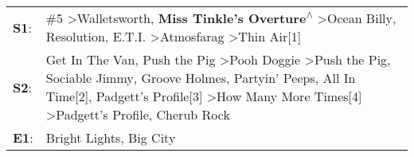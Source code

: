 \begin{supertabular}{p{0.03\textwidth}p{0.92\textwidth}}
 \textbf{S1}:  &                                                                                                                                                                                              \#5\textsuperscript{} \textgreater \enspace Walletsworth\textsuperscript{}, \enspace \textbf{Miss Tinkle's Overture\textsuperscript{$\wedge$}} \textgreater \enspace Ocean Billy\textsuperscript{}, \enspace Resolution\textsuperscript{}, \enspace E.T.I.\textsuperscript{} \textgreater \enspace Atmosfarag\textsuperscript{} \textgreater \enspace Thin Air[1]\textsuperscript{}  \enspace  \\
 \textbf{S2}:  &  Get In The Van\textsuperscript{}, \enspace Push the Pig\textsuperscript{} \textgreater \enspace Pooh Doggie\textsuperscript{} \textgreater \enspace Push the Pig\textsuperscript{}, \enspace Sociable Jimmy\textsuperscript{}, \enspace Groove Holmes\textsuperscript{}, \enspace Partyin' Peeps\textsuperscript{}, \enspace All In Time[2]\textsuperscript{}, \enspace Padgett's Profile[3]\textsuperscript{} \textgreater \enspace How Many More Times[4]\textsuperscript{} \textgreater \enspace Padgett's Profile\textsuperscript{}, \enspace Cherub Rock\textsuperscript{}  \enspace  \\
 \textbf{E1}:  &                                                                                                                                                                                                                                                                                                                                                                                                                                                                                                                                        Bright Lights, Big City\textsuperscript{}  \enspace  \\
\end{supertabular}
